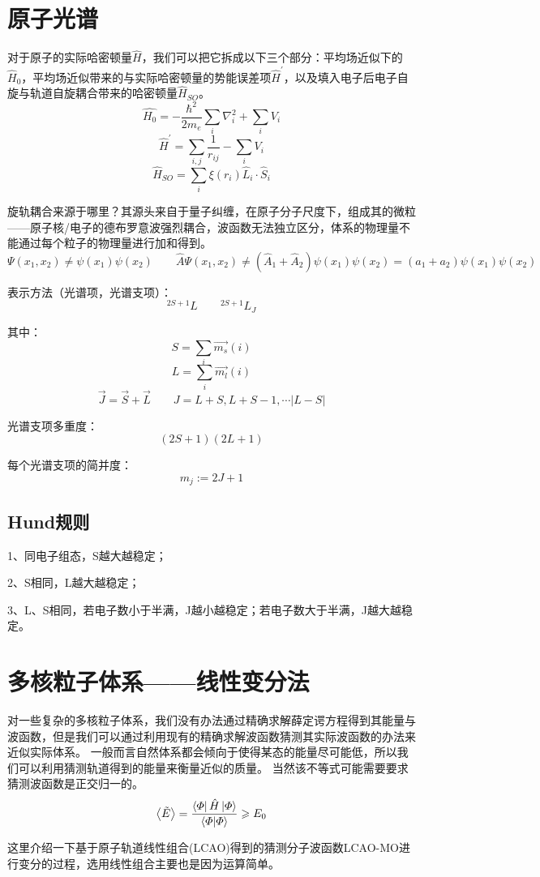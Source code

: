 \section{原子光谱}
对于原子的实际哈密顿量$\hat{H}$，我们可以把它拆成以下三个部分：平均场近似下的$\hat{H}_0$，平均场近似带来的与实际哈密顿量的势能误差项$\hat{H}^{'}$，以及填入电子后电子自旋与轨道自旋耦合带来的哈密顿量$\hat{H}_{SO}$。
\[\hat{H_0}=-\frac{\hbar^2}{2m_e}\sum_i\nabla^2_i+\sum_iV_i\]
\[\hat{H}^{'}=\sum_{i,j}\frac{1}{r_{ij}}-\sum_iV_i\]
\[\hat{H}_{SO}=\sum_{i}\xi(r_i)\hat{L}_i \cdot \hat{S}_i\]

旋轨耦合来源于哪里？其源头来自于量子纠缠，在原子分子尺度下，组成其的微粒——原子核/电子的德布罗意波强烈耦合，波函数无法独立区分，体系的物理量不能通过每个粒子的物理量进行加和得到。
\[\Psi(x_1,x_2) \neq \psi(x_1)\psi(x_2) \qquad \hat{A}\Psi(x_1,x_2) \neq (\hat{A}_1+\hat{A}_2)\psi(x_1)\psi(x_2)=(a_1+a_2)\psi(x_1)\psi(x_2)\]

表示方法（光谱项，光谱支项）：
\[^{2S+1}L \qquad ^{2S+1}L_J\]

其中：
\[S=\sum_i\overrightarrow{m_s}(i)\]
\[L=\sum_i\overrightarrow{m_l}(i)\]
\[\overrightarrow{J}=\overrightarrow{S}+\overrightarrow{L} \qquad J=L+S,L+S-1,\cdots |L-S|\]

光谱支项多重度：
\[(2S+1)(2L+1)\]

每个光谱支项的简并度：
\[m_j:=2J+1\]

\subsection{Hund规则}
1、同电子组态，S越大越稳定；

2、S相同，L越大越稳定；

3、L、S相同，若电子数小于半满，J越小越稳定；若电子数大于半满，J越大越稳定。

\section{多核粒子体系——线性变分法}
对一些复杂的多核粒子体系，我们没有办法通过精确求解薛定谔方程得到其能量与波函数，但是我们可以通过利用现有的精确求解波函数猜测其实际波函数的办法来近似实际体系。
一般而言自然体系都会倾向于使得某态的能量尽可能低，所以我们可以利用猜测轨道得到的能量来衡量近似的质量。
当然该不等式可能需要要求猜测波函数是正交归一的。
\[\expval{\tilde{E}}=\frac{\bra{\varPhi}\hat{H}\ket{\varPhi}}{\bra{\varPhi}\ket{\varPhi}} \geqslant E_0\]

这里介绍一下基于原子轨道线性组合(LCAO)得到的猜测分子波函数LCAO-MO进行变分的过程，选用线性组合主要也是因为运算简单。

